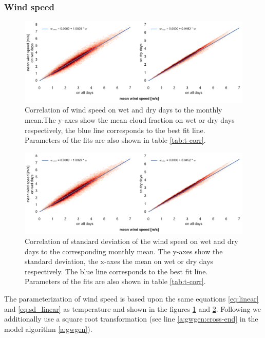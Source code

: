 \begin{refsection}
\subsubsection{Wind speed}
\begin{figure}
	\includegraphics[width=12cm]{figures/wind.pdf}
	\caption[Correlation of wind speed on wet and dry days to the monthly mean]{Correlation of wind speed on wet and dry days to the monthly mean.The y-axes show the mean cloud fraction on wet or dry days respectively, the blue line corresponds to the best fit line. Parameters of the fits are also shown in table \ref{tab:t-corr}.}
	\label{fig:wind}
\end{figure}
\begin{figure}
	\includegraphics[width=12cm, page=2]{figures/wind.pdf}
	\caption[Correlation of standard deviation of wind speed to the monthly mean]{Correlation of standard deviation of the wind speed on wet and dry days to the corresponding monthly mean. The y-axes show the standard deviation, the x-axes the mean on wet or dry days respectively. The blue line corresponds to the best fit line. Parameters of the fits are also shown in table \ref{tab:t-corr}.}
	\label{fig:wind_sd}
\end{figure}

The parameterization of wind speed is based upon the same equations \eqref{eq:linear} and \eqref{eq:sd_linear} as temperature and shown in the figures \ref{fig:wind} and \ref{fig:wind_sd}. Following \cite{ParlangeKatz2000} we additionally use a square root transformation (see line \ref{a:gwgen:cross-end} in the model algorithm \ref{a:gwgen}). 



\end{refsection}
